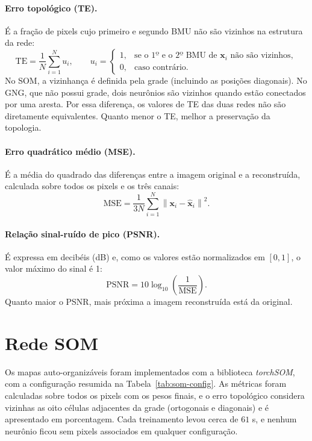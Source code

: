 \documentclass[11pt,a4paper]{article}
\begin{document}
\paragraph{Erro topológico (TE).} É a fração de pixels cujo primeiro e
segundo BMU não são vizinhos na estrutura da rede:
\begin{equation}
  \mathrm{TE} = \frac{1}{N} \sum_{i=1}^{N} u_i,
  \qquad
  u_i =
  \begin{cases}
    1, & \text{se o 1º e o 2º BMU de } \mathbf{x}_i \text{ não são vizinhos},\\
    0, & \text{caso contrário.}
  \end{cases}
\end{equation}
No SOM, a vizinhança é definida pela grade (incluindo as posições diagonais).
No GNG, que não possui grade, dois neurônios são vizinhos quando estão
conectados por uma aresta. Por essa diferença, os valores de TE das duas redes
não são diretamente equivalentes. Quanto menor o TE, melhor a preservação
da topologia.

\paragraph{Erro quadrático médio (MSE).} É a média do quadrado das diferenças
entre a imagem original e a reconstruída, calculada sobre todos os pixels e
os três canais:
\begin{equation}
  \mathrm{MSE} = \frac{1}{3N} \sum_{i=1}^{N}
  \left\lVert \mathbf{x}_i - \hat{\mathbf{x}}_i \right\rVert^{2}.
\end{equation}

\paragraph{Relação sinal-ruído de pico (PSNR).} É expressa em decibéis (dB)
e, como os valores estão normalizados em $[0,1]$, o valor máximo do sinal é 1:
\begin{equation}
  \mathrm{PSNR} = 10 \log_{10} \left( \frac{1}{\mathrm{MSE}} \right).
\end{equation}
Quanto maior o PSNR, mais próxima a imagem reconstruída está da original.

\section{Rede SOM}

Os mapas auto-organizáveis foram implementados com a biblioteca
\textit{torchSOM}, com a configuração resumida na
Tabela~\ref{tab:som-config}. As métricas foram calculadas sobre todos os pixels
com os pesos finais, e o erro topológico considera vizinhas as oito células
adjacentes da grade (ortogonais e diagonais) e é apresentado em porcentagem. Cada
treinamento levou cerca de $61$ s, e nenhum neurônio ficou sem pixels associados
em qualquer configuração.
\end{document}
